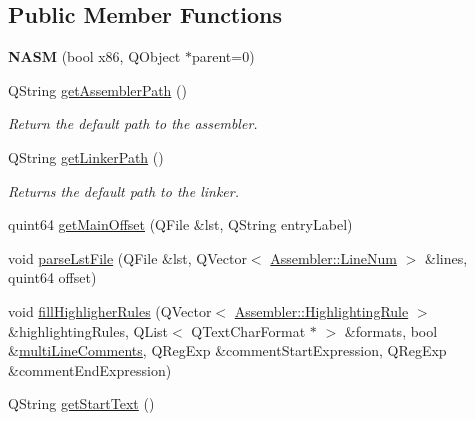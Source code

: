 \subsection*{Public Member Functions}
\begin{DoxyCompactItemize}
\item 
\hypertarget{class_n_a_s_m_a749bc9c7e08e1a9825c889babced7715}{}{\bfseries N\+A\+S\+M} (bool x86, Q\+Object $\ast$parent=0)\label{class_n_a_s_m_a749bc9c7e08e1a9825c889babced7715}

\item 
\hypertarget{class_n_a_s_m_aaf12100ab23992c4314de00fdb537ab5}{}Q\+String \hyperlink{class_n_a_s_m_aaf12100ab23992c4314de00fdb537ab5}{get\+Assembler\+Path} ()\label{class_n_a_s_m_aaf12100ab23992c4314de00fdb537ab5}

\begin{DoxyCompactList}\small\item\em Return the default path to the assembler. \end{DoxyCompactList}\item 
\hypertarget{class_n_a_s_m_a70cb48d7377086470da91aa2748225c4}{}Q\+String \hyperlink{class_n_a_s_m_a70cb48d7377086470da91aa2748225c4}{get\+Linker\+Path} ()\label{class_n_a_s_m_a70cb48d7377086470da91aa2748225c4}

\begin{DoxyCompactList}\small\item\em Returns the default path to the linker. \end{DoxyCompactList}\item 
quint64 \hyperlink{class_n_a_s_m_a432753e32490e7eaa36d9be41d8f1ed4}{get\+Main\+Offset} (Q\+File \&lst, Q\+String entry\+Label)
\item 
void \hyperlink{class_n_a_s_m_a4de842373fdd8be68c23eb3313ad555e}{parse\+Lst\+File} (Q\+File \&lst, Q\+Vector$<$ \hyperlink{struct_assembler_1_1_line_num}{Assembler\+::\+Line\+Num} $>$ \&lines, quint64 offset)
\item 
void \hyperlink{class_n_a_s_m_abcab860e849ddbfe4ead2baaa09ba592}{fill\+Highligher\+Rules} (Q\+Vector$<$ \hyperlink{struct_assembler_1_1_highlighting_rule}{Assembler\+::\+Highlighting\+Rule} $>$ \&highlighting\+Rules, Q\+List$<$ Q\+Text\+Char\+Format $\ast$ $>$ \&formats, bool \&\hyperlink{class_assembler_a8e2ae531c6d59dfea8c7bb90febda262}{multi\+Line\+Comments}, Q\+Reg\+Exp \&comment\+Start\+Expression, Q\+Reg\+Exp \&comment\+End\+Expression)
\item 
\hypertarget{class_n_a_s_m_ab8b2de6d7f780aeb1962d2fa83e5049f}{}Q\+String \hyperlink{class_n_a_s_m_ab8b2de6d7f780aeb1962d2fa83e5049f}{get\+Start\+Text} ()\label{class_n_a_s_m_ab8b2de6d7f780aeb1962d2fa83e5049f}


\end{DoxyCompactItemize}
